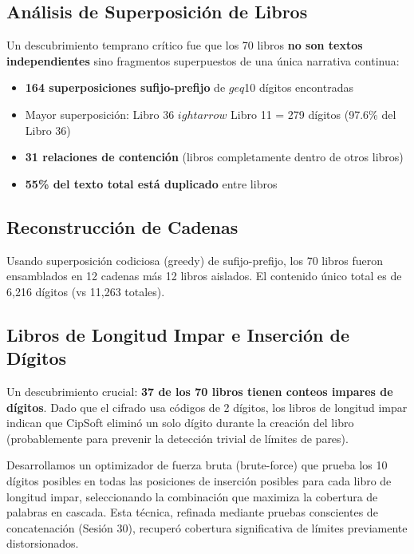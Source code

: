 \documentclass[11pt,a4paper]{article}
\begin{document}
\subsection{An\'{a}lisis de Superposici\'{o}n de Libros}

Un descubrimiento temprano cr\'{i}tico fue que los 70 libros \textbf{no son textos independientes} sino fragmentos superpuestos de una \'{u}nica narrativa continua:

\begin{itemize}
\item \textbf{164 superposiciones sufijo-prefijo} de $geq$10 d\'{i}gitos encontradas
\item Mayor superposici\'{o}n: Libro 36 $
ightarrow$ Libro 11 = 279 d\'{i}gitos (97.6\% del Libro 36)
\item \textbf{31 relaciones de contenci\'{o}n} (libros completamente dentro de otros libros)
\item \textbf{55\% del texto total est\'{a} duplicado} entre libros
\end{itemize}

\subsection{Reconstrucci\'{o}n de Cadenas}

Usando superposici\'{o}n codiciosa (greedy) de sufijo-prefijo, los 70 libros fueron ensamblados en 12 cadenas m\'{a}s 12 libros aislados. El contenido \'{u}nico total es de 6,216 d\'{i}gitos (vs 11,263 totales).

\subsection{Libros de Longitud Impar e Inserci\'{o}n de D\'{i}gitos}

Un descubrimiento crucial: \textbf{37 de los 70 libros tienen conteos impares de d\'{i}gitos}. Dado que el cifrado usa c\'{o}digos de 2 d\'{i}gitos, los libros de longitud impar indican que CipSoft elimin\'{o} un solo d\'{i}gito durante la creaci\'{o}n del libro (probablemente para prevenir la detecci\'{o}n trivial de l\'{i}mites de pares).

Desarrollamos un optimizador de fuerza bruta (brute-force) que prueba los 10 d\'{i}gitos posibles en todas las posiciones de inserci\'{o}n posibles para cada libro de longitud impar, seleccionando la combinaci\'{o}n que maximiza la cobertura de palabras en cascada. Esta t\'{e}cnica, refinada mediante pruebas conscientes de concatenaci\'{o}n (Sesi\'{o}n 30), recuper\'{o} cobertura significativa de l\'{i}mites previamente distorsionados.
\end{document}

